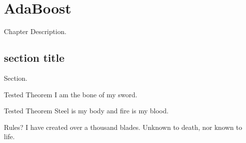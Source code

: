 \chapter{AdaBoost}
Chapter Description.

\section{section title}
Section.
\begin{ln-theorem}{Tested Theorem}{}
    I am the bone of my sword.
\end{ln-theorem}
\begin{ln-define}{Tested Theorem}{}
    Steel is my body and fire is my blood.
\end{ln-define}
\begin{ln-quest}{Rules?}{}
    I have created over a thousand blades.
    \tcblower
    Unknown to death, nor known to life.
\end{ln-quest}
